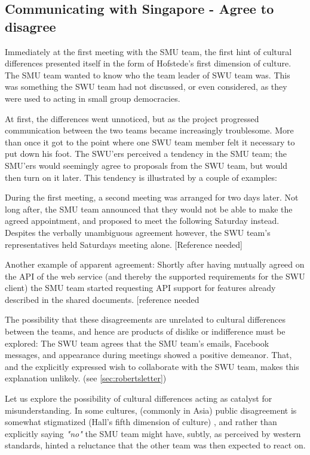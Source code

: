 \subsection{Communicating with Singapore - Agree to disagree}
\label{sec:communicating}

Immediately at the first meeting with the SMU team, the  first hint of cultural
differences presented itself in the form of Hofstede's first
dimension of culture\cite{surprises}. The SMU team wanted to know who the team leader of SWU team was.
This was something the SWU team had not discussed, or even considered, as they
were used to acting in small group democracies.

At first, the differences went unnoticed, but as the project progressed
communication between the two teams became increasingly troublesome.
More than once it got to the point where one SWU team member felt it necessary
to put down his foot\cite{enough}.
The SWU'ers perceived a tendency in the SMU team; the SMU'ers would seemingly
agree to proposals from the SWU team, but would then turn on it later.
This tendency is illustrated by a couple of examples:

During the first meeting, a second meeting was arranged for two
days later. Not long after, the SMU team announced that they would
not be able to make the agreed appointment, and proposed to meet the following
Saturday instead. Despites the verbally unambiguous agreement however,
the SWU team's representatives held Saturdays meeting alone. [Reference needed]

Another example of apparent agreement:
Shortly after having mutually agreed on the API of the web
service (and thereby the supported requirements for the SWU client)
the SMU team started requesting API support for features already
described in the shared documents. [reference needed

The possibility that these disagreements are unrelated to cultural
differences between the teams, and hence are products of dislike or
indifference must be explored: The SWU team agrees that the SMU team's emails, Facebook
messages, and appearance during meetings showed a positive demeanor. That, and
the explicitly expressed wish to collaborate with the SWU team, makes this
explanation unlikely. (see \ref{sec:robertsletter})

Let us explore the possibility of cultural differences acting as catalyst for
misunderstanding. In some cultures, (commonly in Asia) public
disagreement is somewhat stigmatized (Hall's fifth dimension of
culture\cite{surprises}) \cite{herbsiemens}, and rather
than explicitly saying \emph{"no"} the SMU team might have, subtly,
as perceived by western standards, hinted a reluctance
that the other team was then expected to react on.

